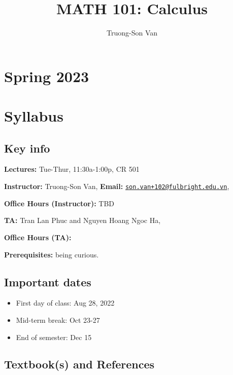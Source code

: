 \documentclass[
]{article}
\title{MATH 101: Calculus}
\author{Truong-Son Van}
\date{}
\providecommand{\tightlist}{%
  \setlength{\itemsep}{0pt}\setlength{\parskip}{0pt}}
\begin{document}
\maketitle

{
\setcounter{tocdepth}{2}
\tableofcontents
}
\hypertarget{spring-2023}{%
\section*{Spring 2023}\label{spring-2023}}

\hypertarget{syllabus}{%
\section*{Syllabus}\label{syllabus}}

\hypertarget{key-info}{%
\subsection*{Key info}\label{key-info}}

\textbf{Lectures:} Tue-Thur, 11:30a-1:00p, CR 501

\textbf{Instructor:} Truong-Son Van, \textbf{Email:} \href{mailto:son.van+102@fulbright.edu.vn}{\nolinkurl{son.van+102@fulbright.edu.vn}},

\textbf{Office Hours (Instructor):} TBD

\textbf{TA:} Tran Lan Phuc and Nguyen Hoang Ngoc Ha,

\textbf{Office Hours (TA):}

\textbf{Prerequisites:} being curious.

\hypertarget{important-dates}{%
\subsection*{Important dates}\label{important-dates}}

\begin{itemize}
\tightlist
\item
  First day of class: Aug 28, 2022
\item
  Mid-term break: Oct 23-27
\item
  End of semester: Dec 15
\end{itemize}

\hypertarget{textbooks-and-references}{%
\subsection*{Textbook(s) and References}\label{textbooks-and-references}}
\end{document}
